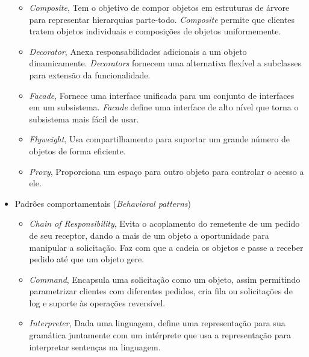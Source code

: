 \begin{itemize}
\begin{itemize}
			\item \emph{Composite}, Tem o objetivo de compor objetos em estruturas de árvore para representar hierarquias parte-todo. \emph{Composite} permite que clientes tratem objetos individuais e composições de objetos
uniformemente.\\

			\item
				\emph{Decorator}, Anexa responsabilidades adicionais a um objeto dinamicamente. \emph{Decorators} fornecem uma alternativa flexível a subclasses para extensão da funcionalidade.\\

			\item \emph{Facade}, Fornece uma interface unificada para um conjunto de interfaces em um subsistema. \emph{Facade} define uma interface de alto nível que torna o subsistema mais fácil de usar.\\

			\item \emph{Flyweight}, Usa compartilhamento para suportar um grande número de objetos de forma eficiente.\\

			\item \emph{Proxy}, Proporciona um espaço para outro objeto para controlar o acesso a ele.\\


		\end{itemize}

	\item
		Padrões comportamentais (\emph{Behavioral patterns})\\

		\begin{itemize}
			\item \emph{Chain of Responsibility}, Evita o acoplamento do remetente de um pedido de seu receptor, dando a mais de um objeto a oportunidade para manipular a solicitação. Faz com que a cadeia os objetos e passe a receber pedido até que um objeto gere.\\

			\item \emph{Command}, Encapsula uma solicitação como um objeto, assim permitindo parametrizar clientes com
diferentes pedidos, cria fila ou solicitações de log e suporte às operações reversível.\\

			\item \emph{Interpreter}, Dada uma linguagem, define uma representação para sua gramática juntamente com um intérprete que usa a representação para interpretar sentenças na linguagem.\\


\end{itemize}
\end{itemize}
